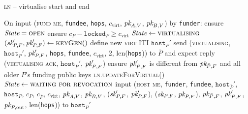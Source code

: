 \begin{center}
  \begin{processbox}{\textsc{ln} -- virtualise start and end}
    \ \\
    \begin{algorithmic}[1]
      \State On input (\textsc{fund me}, \texttt{fundee}, \texttt{hops},
      $c_{\mathrm{virt}}$, $\textit{pk}_{A, V}$, $\textit{pk}_{B, V}$) by \texttt{funder}:
      \Indent
        \State ensure $\itistate = \textsc{open}$
        \State ensure $c_P - \texttt{locked}_P \geq c_{\mathrm{virt}}$
        \State $\itistate \gets \textsc{virtualising}$
        \State $(\textit{sk}_{P, F}', \textit{pk}_{P, F}') \gets \textsc{keyGen}()$
        \State define new \textsc{virt} ITI $\texttt{host}_P'$
        \label{code:ln:virtualise:start-end:define}
        \State send (\textsc{virtualising}, $\texttt{host}_P'$, $\textit{pk}_{P, F}'$,
        \texttt{hops}, \texttt{fundee}, $c_{\mathrm{virt}}$, $2$,
        len(\texttt{hops})) to $\bar{P}$ and expect reply (\textsc{virtualising
        ack}, $\texttt{host}_{\bar{P}}'$, $\textit{pk}_{\bar{P}, F}'$)
        \State ensure $\textit{pk}_{\bar{P}, F}'$ is different from $\textit{pk}_{\bar{P}, F}$ and
        all older $\bar{P}$'s funding public keys
        \State \textsc{ln}.\textsc{updateForVirtual}()
        \label{code:ln:virtualise:start-end:virtual-update}
        \State $\itistate \gets \textsc{waiting for revocation}$
        \State input (\textsc{host me}, \texttt{funder}, \texttt{fundee},
        $\texttt{host}_{\bar{P}}'$, $\texttt{host}_P$, $c_P$, $c_{\bar{P}}$,
        $c_{\mathrm{virt}}$, $\textit{pk}_{A, V}$, $\textit{pk}_{B, V}$, ($\textit{sk}_{P, F}'$, $\textit{pk}_{P,
        F}'$), ($\textit{sk}_{P, F}$, $\textit{pk}_{P, F}$), $\textit{pk}_{\bar{P}, F}$, $\textit{pk}_{\bar{P},
        F}'$, $\textit{pk}_{P, \mathrm{out}}$, len(\texttt{hops})) to $\texttt{host}_P'$
        \label{code:ln:virtualise:start-end:host-me}
      \EndIndent
      \Statex


\end{algorithmic}
\end{processbox}
\end{center}
